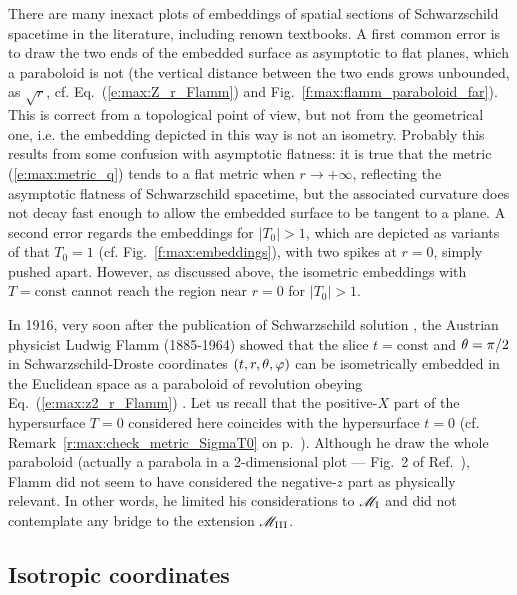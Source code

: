 \begin{remark}
There are many inexact plots of embeddings of spatial sections
of Schwarz\-schild spacetime in the literature, including renown textbooks.
A first common error is to draw the two ends of the embedded surface as asymptotic to flat
planes, which a paraboloid is not (the vertical distance between the two ends grows
unbounded, as $\sqrt{r}$, cf. Eq.~(\ref{e:max:Z_r_Flamm}) and Fig.~\ref{f:max:flamm_paraboloid_far}).
This is correct from a topological point of view,
but not from the geometrical one, i.e. the embedding depicted in this way
is not an isometry. Probably this results from some confusion with asymptotic
flatness: it is true that the metric (\ref{e:max:metric_q}) tends
to a flat metric when $r\rightarrow +\infty$, reflecting the asymptotic
flatness of Schwarzschild spacetime, but the associated curvature does not
decay fast enough to allow the embedded surface to be tangent to a plane.
A second error regards the embeddings for $|T_0|> 1$, which
are depicted as variants of that $T_0=1$ (cf. Fig.~\ref{f:max:embeddings}),
with two spikes at $r=0$, simply pushed apart. However,
as discussed above, the isometric embeddings with $T=\mathrm{const}$
cannot reach the region near $r=0$ for $|T_0|> 1$.
\end{remark}

\begin{hist}
In 1916, very soon after the publication of Schwarzschild solution
\cite{Schwa1916}, the Austrian physicist Ludwig Flamm (1885-1964) showed that the slice $t=\mathrm{const}$
and $\theta=\pi/2$ in Schwarzschild-Droste coordinates $(t,r,\theta,\varphi)$
can be isometrically embedded in the Euclidean space as a paraboloid of
revolution obeying Eq.~(\ref{e:max:z2_r_Flamm}) \cite{Flamm1916}.
Let us recall that the positive-$X$ part of the hypersurface $T=0$ considered here coincides with the
hypersurface $t=0$ (cf. Remark~\ref{r:max:check_metric_SigmaT0} on p.~\pageref{r:max:check_metric_SigmaT0}). Although he draw the whole paraboloid (actually
a parabola in a 2-dimensional plot --- Fig.~2 of Ref.~\cite{Flamm1916}), Flamm did not seem to have considered
the negative-$z$ part as physically relevant. In other words,
he limited his considerations to $\mathscr{M}_{\rm I}$ and did not contemplate any bridge to
the extension $\mathscr{M}_{\rm III}$.
\end{hist}

\subsection{Isotropic coordinates} \label{s:max:isotropic_coord}

